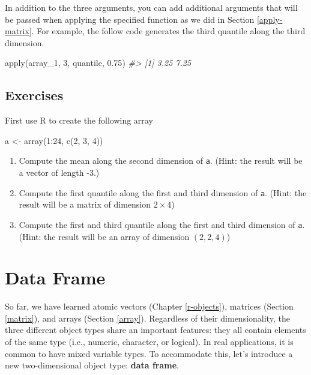 \documentclass[
]{book}
\newenvironment{Shaded}{\begin{snugshade}}{\end{snugshade}}
\newcommand{\CommentTok}[1]{\textcolor[rgb]{0.56,0.35,0.01}{\textit{#1}}}
\newcommand{\DecValTok}[1]{\textcolor[rgb]{0.00,0.00,0.81}{#1}}
\newcommand{\FloatTok}[1]{\textcolor[rgb]{0.00,0.00,0.81}{#1}}
\newcommand{\FunctionTok}[1]{\textcolor[rgb]{0.00,0.00,0.00}{#1}}
\newcommand{\NormalTok}[1]{#1}
\newcommand{\OtherTok}[1]{\textcolor[rgb]{0.56,0.35,0.01}{#1}}
\newcommand{\SpecialCharTok}[1]{\textcolor[rgb]{0.00,0.00,0.00}{#1}}
\providecommand{\tightlist}{%
  \setlength{\itemsep}{0pt}\setlength{\parskip}{0pt}}
\begin{document}
In addition to the three arguments, you can add additional arguments that will be passed when applying the specified function as we did in Section \ref{apply-matrix}. For example, the follow code generates the third quantile along the third dimension.

\begin{Shaded}
\begin{Highlighting}[]
\FunctionTok{apply}\NormalTok{(array\_1, }\DecValTok{3}\NormalTok{, quantile, }\FloatTok{0.75}\NormalTok{) }
\CommentTok{\#\textgreater{} [1] 3.25 7.25}
\end{Highlighting}
\end{Shaded}

\hypertarget{exercises-21}{%
\subsection{Exercises}\label{exercises-21}}

First use R to create the following array

\begin{Shaded}
\begin{Highlighting}[]
\NormalTok{a }\OtherTok{\textless{}{-}} \FunctionTok{array}\NormalTok{(}\DecValTok{1}\SpecialCharTok{:}\DecValTok{24}\NormalTok{, }\FunctionTok{c}\NormalTok{(}\DecValTok{2}\NormalTok{, }\DecValTok{3}\NormalTok{, }\DecValTok{4}\NormalTok{))}
\end{Highlighting}
\end{Shaded}

\begin{enumerate}
\def\labelenumi{\arabic{enumi}.}
\tightlist
\item
  Compute the mean along the second dimension of \texttt{a}. (Hint: the result will be a vector of length -3.)
\item
  Compute the first quantile along the first and third dimension of \texttt{a}. (Hint: the result will be a matrix of dimension \(2\times 4\))
\item
  Compute the first and third quantile along the first and third dimension of \texttt{a}. (Hint: the result will be an array of dimension \((2, 2, 4)\))
\end{enumerate}

\hypertarget{dataframe}{%
\section{Data Frame}\label{dataframe}}

So far, we have learned atomic vectors (Chapter \ref{r-objects}), matrices (Section \ref{matrix}), and arrays (Section \ref{array}). Regardless of their dimensionality, the three different object types share an important features: they all contain elements of the same type (i.e., numeric, character, or logical). In real applications, it is common to have mixed variable types. To accommodate this, let's introduce a new two-dimensional object type: \textbf{data frame}.
\end{document}

